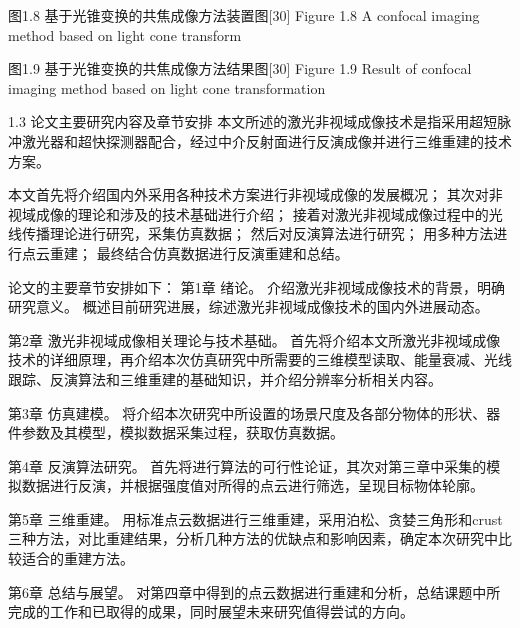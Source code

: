  
图1.8  基于光锥变换的共焦成像方法装置图[30]
Figure 1.8 A confocal imaging method based on light cone transform

 
图1.9  基于光锥变换的共焦成像方法结果图[30]
Figure 1.9 Result of confocal imaging method based on light cone transformation

1.3  论文主要研究内容及章节安排
本文所述的激光非视域成像技术是指采用超短脉冲激光器和超快探测器配合，经过中介反射面进行反演成像并进行三维重建的技术方案。

本文首先将介绍国内外采用各种技术方案进行非视域成像的发展概况；
其次对非视域成像的理论和涉及的技术基础进行介绍；
接着对激光非视域成像过程中的光线传播理论进行研究，采集仿真数据；
然后对反演算法进行研究；
用多种方法进行点云重建；
最终结合仿真数据进行反演重建和总结。
 
论文的主要章节安排如下：
第1章 绪论。
介绍激光非视域成像技术的背景，明确研究意义。
概述目前研究进展，综述激光非视域成像技术的国内外进展动态。

第2章 激光非视域成像相关理论与技术基础。
首先将介绍本文所激光非视域成像技术的详细原理，再介绍本次仿真研究中所需要的三维模型读取、能量衰减、光线跟踪、反演算法和三维重建的基础知识，并介绍分辨率分析相关内容。

第3章 仿真建模。
将介绍本次研究中所设置的场景尺度及各部分物体的形状、器件参数及其模型，模拟数据采集过程，获取仿真数据。
 
第4章 反演算法研究。
首先将进行算法的可行性论证，其次对第三章中采集的模拟数据进行反演，并根据强度值对所得的点云进行筛选，呈现目标物体轮廓。

第5章 三维重建。
用标准点云数据进行三维重建，采用泊松、贪婪三角形和crust三种方法，对比重建结果，分析几种方法的优缺点和影响因素，确定本次研究中比较适合的重建方法。

第6章 总结与展望。
对第四章中得到的点云数据进行重建和分析，总结课题中所完成的工作和已取得的成果，同时展望未来研究值得尝试的方向。

